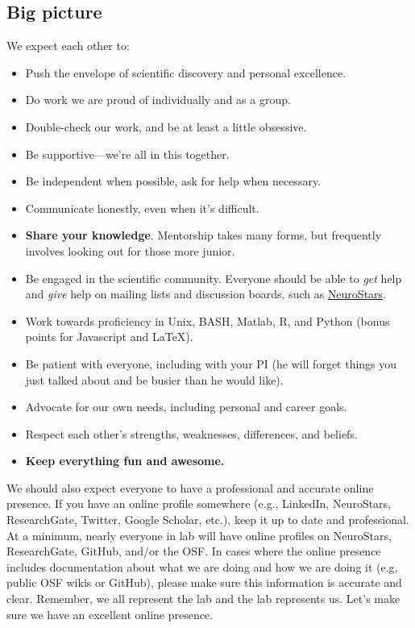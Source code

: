 \documentclass[letterpaper,12pt,oneside]{memoir}
\begin{document}
\subsection{Big picture}

We expect each other to:

\begin{itemize}
\item Push the envelope of scientific discovery and personal excellence. 
\item Do work we are proud of individually and as a group.
\item Double-check our work, and be at least a little obsessive.
\item Be supportive---we're all in this together.
\item Be independent when possible, ask for help when necessary.
\item Communicate honestly, even when it's difficult.
\item \textbf{Share your knowledge}. Mentorship takes many forms, but frequently involves looking out for those more junior.
\item Be engaged in the scientific community. Everyone should be able to \textit{get} help and \textit{give} help on mailing lists and discussion boards, such as \href{https://neurostars.org}{NeuroStars}.
\item Work towards proficiency in Unix, BASH, Matlab, R, and Python (bonus points for Javascript and \LaTeX).
\item Be patient with everyone, including with your PI (he will forget things you just talked about and be busier than he would like).
\item Advocate for our own needs, including personal and career goals.
\item Respect each other's strengths, weaknesses, differences, and beliefs.
\item \textbf{Keep everything fun and awesome.}
\end{itemize}

We should also expect everyone to have a professional and accurate online presence. If you have an online profile somewhere (e.g., LinkedIn, NeuroStars, ResearchGate, Twitter, Google Scholar, etc.), keep it up to date and professional. At a minimum, nearly everyone in lab will have online profiles on NeuroStars, ResearchGate, GitHub, and/or the OSF. In cases where the online presence includes documentation about what we are doing and how we are doing it (e.g, public OSF wikis or GitHub), please make sure this information is accurate and clear. Remember, we all represent the lab and the lab represents us. Let's make sure we have an excellent online presence.
\end{document}
